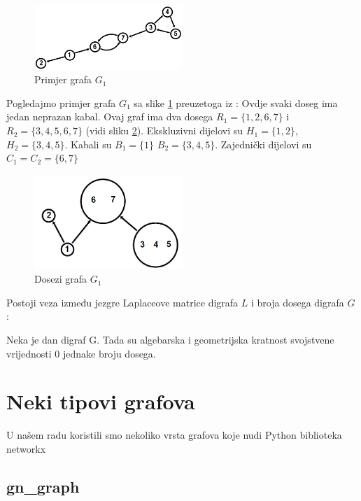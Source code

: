 \begin{figure}[H]
    \centering
    \includegraphics[width=0.5\textwidth]{digrafPrimjer.png}
    \caption{Primjer grafa $G_1$}
    \label{fig:Pr1}
\end{figure}

\begin{exa}
    Pogledajmo primjer grafa $G_1$ sa slike \ref{fig:Pr1} preuzetoga iz \cite{DiGraphReach}:  
Ovdje svaki doseg ima jedan neprazan kabal. Ovaj graf ima dva dosega $R_1 = \{1,2,6,7\}$ i $R_2 = \{3,4,5,6,7\}$ (vidi sliku \ref{fig:Pr1_dosezi}). Ekskluzivni dijelovi su $H_1 = \{ 1,2\}$, $H_2 = \{3,4,5\}$. Kabali su $B_1 = \{1\}$ $B_2 = \{3,4,5\}$. Zajednički dijelovi su $C_1 = C_2 = \{6,7\}$
\end{exa}
\begin{figure}[H]
    \centering
    \includegraphics[width=0.5\textwidth]{digrafPrimjer_reaches.png}
    \caption{Dosezi grafa $G_1$}
    \label{fig:Pr1_dosezi}
\end{figure}

Postoji veza između jezgre Laplaceove matrice digrafa $L$ i broja dosega digrafa $G$ \cite{DiGraph_Kernel}:
\begin{thm} %
    Neka je dan digraf G. Tada su algebarska i geometrijska kratnost svojstvene vrijednosti 0 jednake broju dosega. 
\end{thm}
\clearpage
\section[Grafovi u testu][Nekoliko tipova grafova korištenih za testiranje]{Neki tipovi grafova}
U našem radu koristili smo nekoliko vrsta grafova koje nudi Python biblioteka networkx
\subsection{gn\_graph}

